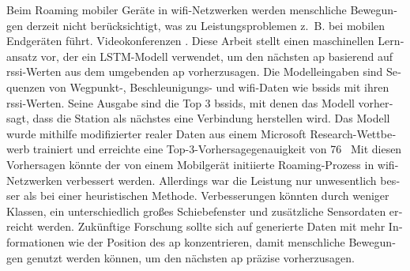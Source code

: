 \null\vfil
\begin{otherlanguage}{ngerman}
\begin{center}\textsf{\textbf{\abstractname}}\end{center}

\noindent 
Beim Roaming mobiler Geräte in \ac{wifi}-Netzwerken werden menschliche Bewegungen derzeit nicht berücksichtigt, was zu Leistungsproblemen z. B. bei mobilen Endgeräten führt. Videokonferenzen \cite{handoff_performance_issues}.
Diese Arbeit stellt einen maschinellen Lernansatz vor, der ein LSTM-Modell verwendet, um den nächsten \ac{ap} basierend auf \ac{rssi}-Werten aus dem umgebenden \ac{ap} vorherzusagen.
Die Modelleingaben sind Sequenzen von Wegpunkt-, Beschleunigungs- und \ac{wifi}-Daten wie \acp{bssid} mit ihren \ac{rssi}-Werten.
Seine Ausgabe sind die Top 3 \acp{bssid}, mit denen das Modell vorhersagt, dass die Station als nächstes eine Verbindung herstellen wird.
Das Modell wurde mithilfe modifizierter realer Daten aus einem Microsoft Research-Wettbewerb trainiert und erreichte eine Top-3-Vorhersagegenauigkeit von 76 %
Mit diesen Vorhersagen könnte der von einem Mobilgerät initiierte Roaming-Prozess in \ac{wifi}-Netzwerken verbessert werden.
Allerdings war die Leistung nur unwesentlich besser als bei einer heuristischen Methode.
Verbesserungen könnten durch weniger Klassen, ein unterschiedlich großes Schiebefenster und zusätzliche Sensordaten erreicht werden.
Zukünftige Forschung sollte sich auf generierte Daten mit mehr Informationen wie der Position des \ac{ap} konzentrieren, damit menschliche Bewegungen genutzt werden können, um den nächsten \ac{ap} präzise vorherzusagen.
\end{otherlanguage}
\vfil\null